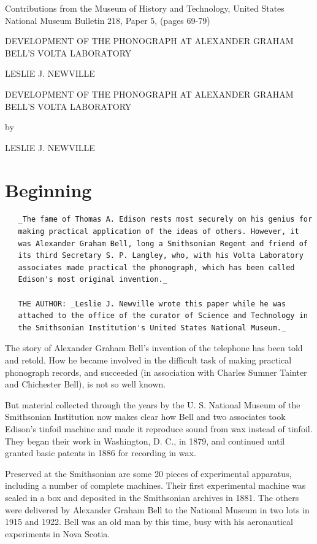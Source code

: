 \documentclass[12pt,oneside]{scrbook}
\begin{document}
  Contributions from the Museum of History and Technology, United States
  National Museum Bulletin 218, Paper 5, (pages 69-79)
  
  DEVELOPMENT OF THE PHONOGRAPH AT ALEXANDER GRAHAM BELL'S VOLTA
  LABORATORY
  
  LESLIE J. NEWVILLE
  
  DEVELOPMENT OF THE PHONOGRAPH AT ALEXANDER GRAHAM BELL'S VOLTA
  LABORATORY
  
  by
  
  LESLIE J. NEWVILLE
  
  \section*{Beginning}\label{beginning}
  
  \begin{verbatim}
   _The fame of Thomas A. Edison rests most securely on his genius for
   making practical application of the ideas of others. However, it
   was Alexander Graham Bell, long a Smithsonian Regent and friend of
   its third Secretary S. P. Langley, who, with his Volta Laboratory
   associates made practical the phonograph, which has been called
   Edison's most original invention._
  
   THE AUTHOR: _Leslie J. Newville wrote this paper while he was
   attached to the office of the curator of Science and Technology in
   the Smithsonian Institution's United States National Museum._
  \end{verbatim}
  
  The story of Alexander Graham Bell's invention of the telephone has been
  told and retold. How he became involved in the difficult task of making
  practical phonograph records, and succeeded (in association with Charles
  Sumner Tainter and Chichester Bell), is not so well known.
  
  But material collected through the years by the U. S. National Museum of
  the Smithsonian Institution now makes clear how Bell and two associates
  took Edison's tinfoil machine and made it reproduce sound from wax
  instead of tinfoil. They began their work in Washington, D. C., in 1879,
  and continued until granted basic patents in 1886 for recording in wax.
  
  Preserved at the Smithsonian are some 20 pieces of experimental
  apparatus, including a number of complete machines. Their first
  experimental machine was sealed in a box and deposited in the
  Smithsonian archives in 1881. The others were delivered by Alexander
  Graham Bell to the National Museum in two lots in 1915 and 1922. Bell
  was an old man by this time, busy with his aeronautical experiments in
  Nova Scotia.
  
\end{document}
